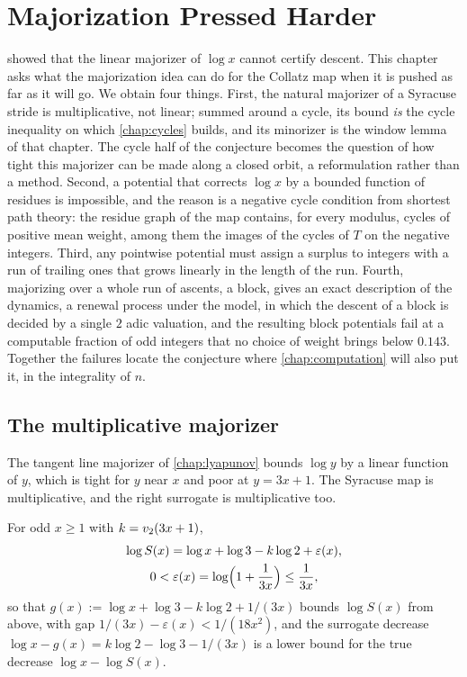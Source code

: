 \chapter{Majorization Pressed Harder}\label{chap:mmcollatz}

 showed that the linear majorizer of $\log x$ cannot certify descent.
This chapter asks what the majorization idea can do for
the Collatz map when it is pushed as far as it will go. We obtain four things.
First, the natural majorizer of a Syracuse stride is multiplicative, not
linear; summed around a cycle, its bound \emph{is} the cycle
inequality on which \cref{chap:cycles} builds, and its minorizer is the window lemma of that chapter. The
cycle half of the conjecture becomes the question of how tight this majorizer
can be made along a closed orbit, a reformulation rather than a method. Second, a potential that corrects $\log x$ by a bounded
function of residues is impossible, and the reason is a negative cycle
condition from shortest path theory: the residue graph of the map contains,
for every modulus, cycles of positive mean weight, among them the images of the cycles of $T$ on
the negative integers. Third, any pointwise potential must assign a surplus to
integers with a run of trailing ones that grows linearly in the length of the
run. Fourth, majorizing over a whole run of ascents, a block, gives an exact
description of the dynamics, a renewal process under the model, in which the descent of a block is decided
by a single $2$ adic valuation, and the resulting block potentials fail at a
computable fraction of odd integers that no choice of weight brings below $0.143$.
Together the failures locate the conjecture
where \cref{chap:computation} will also put it, in the integrality of $n$.

\section{The multiplicative majorizer}\label{sec:ch5c:mult}

The tangent line majorizer of \cref{chap:lyapunov} bounds $\log y$ by a linear function of
$y$, which is tight for $y$ near $x$ and poor at $y=3x+1$. The Syracuse map is
multiplicative, and the right surrogate is multiplicative too.

\begin{proposition}\label{prop:ch5c:stride}
For odd $x\ge1$ with $k=v_2(3x+1)$,
\begin{equation}\label{eq:ch5c:stride}
\begin{gathered}
  \log S(x)=\log x+\log3-k\log2+\varepsilon(x),\\
  0<\varepsilon(x)=\log\Bigl(1+\frac1{3x}\Bigr)\le\frac1{3x},
\end{gathered}
\end{equation}
so that $g(x):=\log x+\log3-k\log2+1/(3x)$ bounds $\log S(x)$ from above,
with gap $1/(3x)-\varepsilon(x)<1/(18x^2)$, and the surrogate decrease
$\log x-g(x)=k\log2-\log3-1/(3x)$ is a lower bound for the true
decrease $\log x-\log S(x)$.
\end{proposition}

